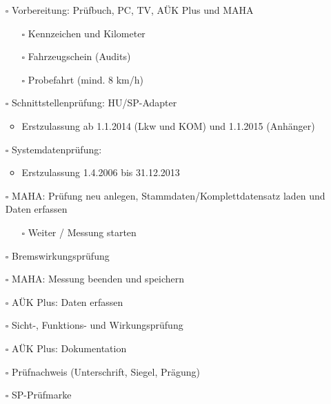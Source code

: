 \documentclass{vorlage-design-main}
\begin{document}
\begin{itemize}

\item[$\square$]
  Vorbereitung: Prüfbuch, PC, TV, AÜK Plus und MAHA

  \begin{itemize}
  
  \item[$\square$]
    Kennzeichen und Kilometer
  \item[$\square$]
    Fahrzeugschein (Audits)
  \item[$\square$]
    Probefahrt (mind. 8 km/h)
  \end{itemize}
\item[$\square$]
  Schnittstellenprüfung: HU/SP-Adapter

  \begin{itemize}
  
  \item
    Erstzulassung ab 1.1.2014 (Lkw und KOM) und 1.1.2015 (Anhänger)
  \end{itemize}
\item[$\square$]
  Systemdatenprüfung:

  \begin{itemize}
  
  \item
    Erstzulassung 1.4.2006 bis 31.12.2013
  \end{itemize}
\item[$\square$]
  MAHA: Prüfung neu anlegen, Stammdaten/Komplettdatensatz laden und
  Daten erfassen

  \begin{itemize}
  
  \item[$\square$]
    Weiter / Messung starten
  \end{itemize}
\item[$\square$]
  Bremswirkungsprüfung
\item[$\square$]
  MAHA: Messung beenden und speichern
\item[$\square$]
  AÜK Plus: Daten erfassen
\item[$\square$]
  Sicht-, Funktions- und Wirkungsprüfung
\item[$\square$]
  AÜK Plus: Dokumentation
\item[$\square$]
  Prüfnachweis (Unterschrift, Siegel, Prägung)
\item[$\square$]
  SP-Prüfmarke

  \begin{itemize}
  

\end{itemize}
\end{itemize}
\end{document}
